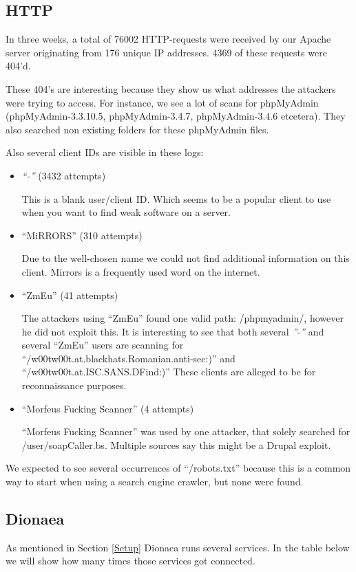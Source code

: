 \documentclass[11pt]{article}
\begin{document}
\subsection{HTTP}
In three weeks, a total of 76002 HTTP-requests were received by our Apache server originating from 176 unique IP addresses. 4369 of these requests were 404'd.

These 404's are interesting because they show us what addresses the attackers were trying to access. For instance, we see a lot of scans for phpMyAdmin (phpMyAdmin-3.3.10.5, phpMyAdmin-3.4.7, phpMyAdmin-3.4.6 etcetera). They also searched non existing folders for these phpMyAdmin files. 

Also several client IDs are visible in these logs: 

\begin{itemize}
\item \emph{``-''} (3432 attempts)

This is a blank user/client ID. Which seems to be a popular client to use when you want to find weak software on a server.

\item ``MiRRORS'' (310 attempts)

Due to the well-chosen name we could not find additional information on this client. Mirrors is a frequently used word on the internet.

\item ``ZmEu'' (41 attempts)

The attackers using ``ZmEu'' found one valid path: /phpmyadmin/, however he did not exploit this. 
It is interesting to see that both several \emph{''-''} and several ``ZmEu'' users are scanning for ``/w00tw00t.at.blackhats.Romanian.anti-sec:)'' and ``/w00tw00t.at.ISC.SANS.DFind:)'' These clients are alleged to be for reconnaissance purposes.

\item ``Morfeus Fucking Scanner'' (4 attempts)

``Morfeus Fucking Scanner'' was used by one attacker, that solely searched for /user/soapCaller.bs. Multiple sources say this might be a Drupal exploit.
\end{itemize}

We expected to see several occurrences of ``/robots.txt'' because this is a common way to start when using a search engine crawler, but none were found.

\subsection{Dionaea}
As mentioned in Section \ref{Setup} Dionaea runs several services. In the table below we will show how many times those services got connected.
\end{document}
